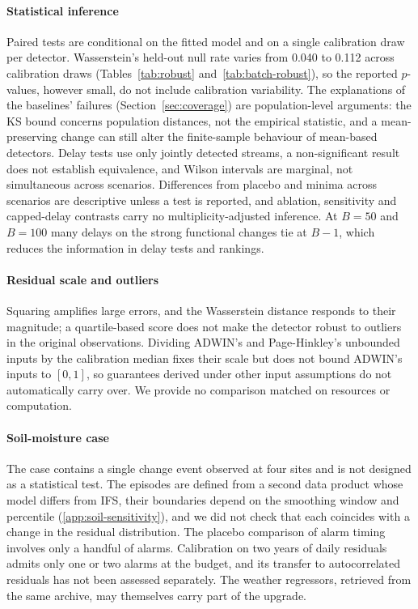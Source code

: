 \documentclass[preprint,12pt]{elsarticle}
\begin{document}
\paragraph{Statistical inference} Paired tests are conditional on the fitted model and on a single calibration draw per detector. Wasserstein's held-out null rate varies from 0.040 to 0.112 across calibration draws (Tables~\ref{tab:robust} and~\ref{tab:batch-robust}), so the reported $p$-values, however small, do not include calibration variability. The explanations of the baselines' failures (Section~\ref{sec:coverage}) are population-level arguments: the KS bound concerns population distances, not the empirical statistic, and a mean-preserving change can still alter the finite-sample behaviour of mean-based detectors. Delay tests use only jointly detected streams, a non-significant result does not establish equivalence, and Wilson intervals are marginal, not simultaneous across scenarios. Differences from placebo and minima across scenarios are descriptive unless a test is reported, and ablation, sensitivity and capped-delay contrasts carry no multiplicity-adjusted inference. At $B=50$ and $B=100$ many delays on the strong functional changes tie at $B-1$, which reduces the information in delay tests and rankings.

\paragraph{Residual scale and outliers} Squaring amplifies large errors, and the Wasserstein distance responds to their magnitude; a quartile-based score does not make the detector robust to outliers in the original observations. Dividing ADWIN's and Page-Hinkley's unbounded inputs by the calibration median fixes their scale but does not bound ADWIN's inputs to $[0,1]$, so guarantees derived under other input assumptions do not automatically carry over. We provide no comparison matched on resources or computation.

\paragraph{Soil-moisture case} The case contains a single change event observed at four sites and is not designed as a statistical test. The episodes are defined from a second data product whose model differs from IFS, their boundaries depend on the smoothing window and percentile (\ref{app:soil-sensitivity}), and we did not check that each coincides with a change in the residual distribution. The placebo comparison of alarm timing involves only a handful of alarms. Calibration on two years of daily residuals admits only one or two alarms at the budget, and its transfer to autocorrelated residuals has not been assessed separately. The weather regressors, retrieved from the same archive, may themselves carry part of the upgrade.
\end{document}
